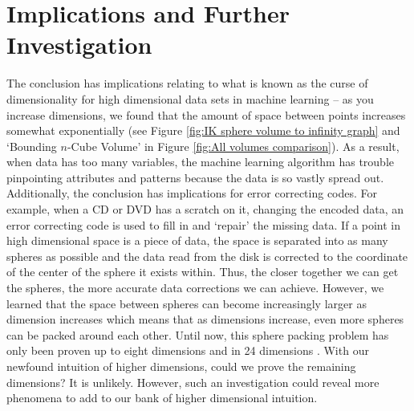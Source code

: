 \section{Implications and Further Investigation} 
The conclusion has implications relating to what is known as the curse of dimensionality \cite{raviv2020perm2vec} for high dimensional data sets in machine learning -- as you increase dimensions, we found that the amount of space between points increases somewhat exponentially (see Figure \ref{fig:IK sphere volume to infinity graph} and `Bounding $n$-Cube Volume' in Figure \ref{fig:All volumes comparison}). As a result, when data has too many variables, the machine learning algorithm has trouble pinpointing attributes and patterns because the data is so vastly spread out. Additionally, the conclusion has implications for error correcting codes. For example, when a CD or DVD has a scratch on it, changing the encoded data, an error correcting code is used to fill in and `repair' the missing data. If a point in high dimensional space is a piece of data, the space is separated into as many spheres as possible and the data read from the disk is corrected to the coordinate of the center of the sphere it exists within. Thus, the closer together we can get the spheres, the more accurate data corrections we can achieve. However, we learned that the space between spheres can become increasingly larger as dimension increases which means that as dimensions increase, even more spheres can be packed around each other. Until now, this sphere packing problem has only been proven up to eight dimensions and in 24 dimensions \cite{klarreich2016sphere}. With our newfound intuition of higher dimensions, could we prove the remaining dimensions? It is unlikely. However, such an investigation could reveal more phenomena to add to our bank of higher dimensional intuition.
